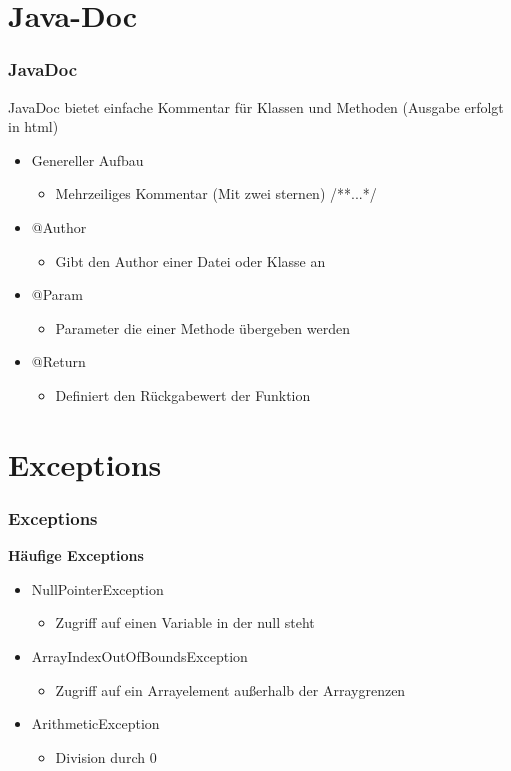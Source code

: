 \documentclass[final]{beamer}
\begin{document}
\section{Java-Doc}
\begin{frame}
	\frametitle{JavaDoc}
	JavaDoc bietet einfache Kommentar für Klassen und Methoden (Ausgabe erfolgt in html)
	\begin{itemize}
		\item{Genereller Aufbau}
			\begin{itemize}
				\item{Mehrzeiliges Kommentar (Mit zwei sternen) /**...*/}
			\end{itemize}
		\item{@Author}
			\begin{itemize}
				\item{Gibt den Author einer Datei oder Klasse an}
			\end{itemize}
		\item{@Param}
			\begin{itemize}
				\item{Parameter die einer Methode übergeben werden}
			\end{itemize}
		\item{@Return}
			\begin{itemize}
				\item{Definiert den Rückgabewert der Funktion}
			\end{itemize}
	\end{itemize}
\end{frame}

\section{Exceptions}
\begin{frame}
	\frametitle{Exceptions}
	\textbf{Häufige Exceptions}
	\begin{itemize}
		\item{NullPointerException}
			\begin{itemize}
				\item{Zugriff auf einen Variable in der \color{blue}null \color{black} steht}
			\end{itemize}
		\item{ArrayIndexOutOfBoundsException}
			\begin{itemize}
				\item{Zugriff auf ein Arrayelement außerhalb der Arraygrenzen}
			\end{itemize}
		\item{ArithmeticException}
			\begin{itemize}
				\item{Division durch 0}
			\end{itemize}
	\end{itemize}
\end{frame}
\end{document}
